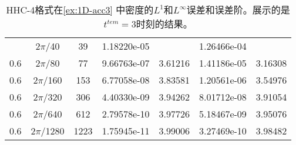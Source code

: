 \begin{table}[htbp]
	\caption{HHC-4格式在\cref{ex:1D-acc3} 中密度的$L^1$和$L^\infty$误差和误差阶。展示的是$t^{tem} = 3$时刻的结果。}
	\label{ta:1D-ex3-HHC4}
	\centering
	\begin{tabular}{ccccccc}
		\toprule
		\titleintable
		\midrule
		0.6 & $2\pi$/40   & 39   & 1.18220e-05 &         & 1.26466e-04 &             \\
		0.6 & $2\pi$/80   & 77   & 9.66763e-07 & 3.61216 & 1.41186e-05 & 3.16308 \\
		0.6 & $2\pi$/160  & 153  & 6.77058e-08 & 3.83581 & 1.20561e-06 & 3.54976  \\
		0.6 & $2\pi$/320  & 306  & 4.40330e-09 & 3.94262 & 8.01712e-08 & 3.91054 \\
		0.6 & $2\pi$/640  & 612  & 2.79578e-10 & 3.97726 & 5.18467e-09 & 3.95076 \\
		0.6 & $2\pi$/1280 & 1223 & 1.75945e-11 & 3.99006 & 3.27469e-10 & 3.98482 \\
		\bottomrule
	\end{tabular}
\end{table}
\undef\titleintable